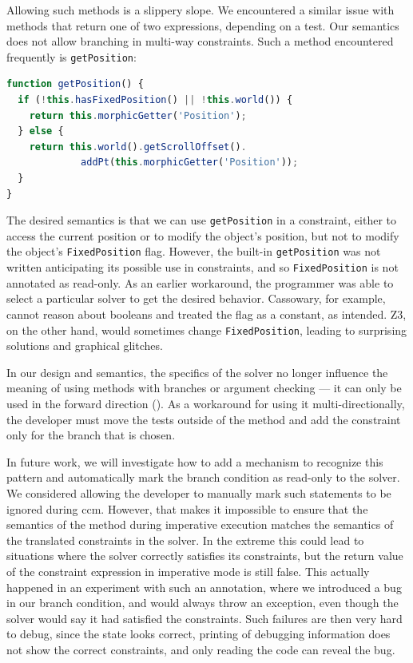 Allowing such methods is a slippery slope. We encountered a similar issue with
methods that return one of two expressions, depending on a test. Our semantics
does not allow branching in multi-way constraints. Such a method encountered
frequently is \verb!getPosition!:
\begin{lstlisting}[language=JavaScript]
function getPosition() {
  if (!this.hasFixedPosition() || !this.world()) {
    return this.morphicGetter('Position');
  } else {
    return this.world().getScrollOffset().
             addPt(this.morphicGetter('Position'));
  }
}
\end{lstlisting}
The desired semantics is that we can use \verb!getPosition! in a constraint,
either to access the current position or to modify the object's position, but
not to modify the object's \verb!FixedPosition!  flag.  However, the built-in
\verb!getPosition! was not written anticipating its possible use in constraints,
and so \verb!FixedPosition! is not annotated as read-only. As an earlier
workaround, the programmer was able to select a particular solver to get the
desired behavior. Cassowary, for example, cannot reason about booleans and
treated the flag as a constant, as intended. Z3, on the other hand, would
sometimes change \verb!FixedPosition!, leading to surprising solutions and
graphical glitches.

In our design and semantics, the specifics of the solver no longer influence the
meaning of using methods with branches or argument checking --- it can only be
used in the forward direction (). As a
workaround for using it multi-directionally, the developer must move the tests
outside of the method and add the constraint only for the branch that is chosen.

In future work, we will investigate how to add a mechanism to recognize this
pattern and automatically mark the branch condition as read-only to the
solver. We considered allowing the developer to manually mark such statements to
be ignored during \acrlong{ccm}. However, that makes it impossible to ensure
that the semantics of the method during imperative execution matches the semantics
of the translated constraints in the solver. In the extreme this could lead to
situations where the solver correctly satisfies its constraints, but the return
value of the constraint expression in imperative mode is still false. This
actually happened in an experiment with such an annotation, where we introduced
a bug in our branch condition, and would always throw an exception, even though
the solver would say it had satisfied the constraints. Such failures are then
very hard to debug, since the state looks correct, printing of debugging
information does not show the correct constraints, and only reading the code can
reveal the bug.

